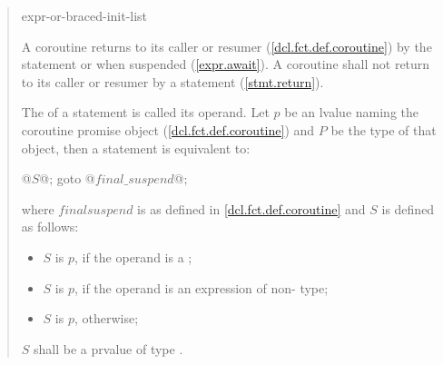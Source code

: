 \begin{quote}

\begin{bnf}
	\br
	 expr-or-braced-init-list\opt \terminal{;}\br
\end{bnf}

\pnum
A coroutine returns to its caller or resumer (\ref{dcl.fct.def.coroutine}) by the  statement
or when suspended (\ref{expr.await}). A coroutine shall not return to its caller or resumer by a  statement (\ref{stmt.return}).

\pnum
The  of a  statement is called its operand.
Let $p$ be an lvalue naming the coroutine promise object (\ref{dcl.fct.def.coroutine}) and $P$ be the type of that object, 
then a  statement is equivalent to:

 

\begin{codeblock}
  { @$S$@; goto @$final{\_}suspend$@; }
\end{codeblock}

where $final$\tcode{\_}$suspend$ is as defined in \ref{dcl.fct.def.coroutine} and $S$ is defined as follows:

\begin{itemize}
  \item $S$ is  $p$\tcode{)}, if the operand is a ;
  \item $S$ is  $p$\tcode{)}, if the operand is an expression of non- type;
  \item $S$ is \tcode{\{}{ }\opt \tcode{;} $p$\tcode{;{ }\}}, otherwise;
\end{itemize}
$S$ shall be a prvalue of type .


\end{quote}
